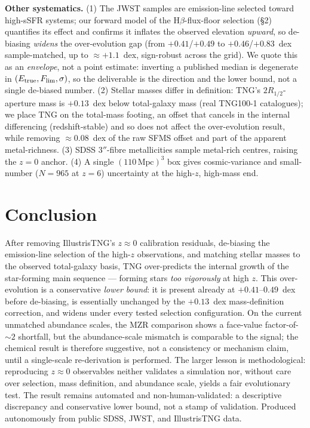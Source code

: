 \documentclass[twocolumn]{aastex631}
\begin{document}
\textbf{Other systematics.} (1) The JWST samples are emission-line selected toward high-sSFR systems; our forward model of the $\mathrm{H}\beta$-flux-floor selection (\S2) quantifies its effect and confirms it inflates the observed elevation \emph{upward}, so de-biasing \emph{widens} the over-evolution gap (from $+0.41$/$+0.49$ to $+0.46$/$+0.83$~dex sample-matched, up to $\approx+1.1$~dex, sign-robust across the grid). We quote this as an \emph{envelope}, not a point estimate: inverting a published median is degenerate in $(E_{\rm true},F_{\rm lim},\sigma)$, so the deliverable is the direction and the lower bound, not a single de-biased number. (2) Stellar masses differ in definition: TNG's $2R_{1/2}$-aperture mass is $+0.13$~dex below total-galaxy mass (real TNG100-1 catalogues); we place TNG on the total-mass footing, an offset that cancels in the internal differencing (redshift-stable) and so does not affect the over-evolution result, while removing $\approx0.08$~dex of the raw SFMS offset and part of the apparent metal-richness. (3) SDSS $3''$-fibre metallicities sample metal-rich centres, raising the $z=0$ anchor. (4) A single $(110\,\mathrm{Mpc})^3$ box gives cosmic-variance and small-number ($N=965$ at $z=6$) uncertainty at the high-$z$, high-mass end.

\section{Conclusion}
After removing IllustrisTNG's $z\approx0$ calibration residuals, de-biasing the emission-line selection of the high-$z$ observations, and matching stellar masses to the observed total-galaxy basis, TNG over-predicts the internal growth of the star-forming main sequence --- forming stars \emph{too vigorously} at high $z$. This over-evolution is a conservative \emph{lower bound}: it is present already at $+0.41$--$0.49$~dex before de-biasing, is essentially unchanged by the $+0.13$~dex mass-definition correction, and widens under every tested selection configuration. On the current unmatched abundance scales, the MZR comparison shows a face-value factor-of-$\sim2$ shortfall, but the abundance-scale mismatch is comparable to the signal; the chemical result is therefore suggestive, not a consistency or mechanism claim, until a single-scale re-derivation is performed. The larger lesson is methodological: reproducing $z\approx0$ observables neither validates a simulation nor, without care over selection, mass definition, and abundance scale, yields a fair evolutionary test. The result remains automated and non-human-validated: a descriptive discrepancy and conservative lower bound, not a stamp of validation. Produced autonomously from public SDSS, JWST, and IllustrisTNG data.
\end{document}
